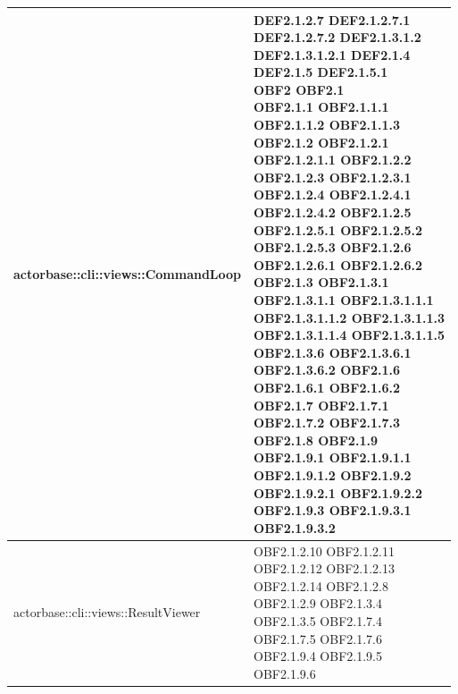 \documentclass{scalatekids-article}
\begin{document}
\begin{longtable}[H]{|p{12cm}|p{5.5cm}|}
\hline
actorbase::cli::views::CommandLoop & \multiLineCell[t]{DEF2.1.2.7 DEF2.1.2.7.1\\DEF2.1.2.7.2 DEF2.1.3.1.2\\DEF2.1.3.1.2.1 DEF2.1.4\\DEF2.1.5 DEF2.1.5.1\\OBF2 OBF2.1\\OBF2.1.1 OBF2.1.1.1\\OBF2.1.1.2 OBF2.1.1.3\\OBF2.1.2 OBF2.1.2.1\\OBF2.1.2.1.1 OBF2.1.2.2\\OBF2.1.2.3 OBF2.1.2.3.1\\OBF2.1.2.4 OBF2.1.2.4.1\\OBF2.1.2.4.2 OBF2.1.2.5\\OBF2.1.2.5.1 OBF2.1.2.5.2\\OBF2.1.2.5.3 OBF2.1.2.6\\OBF2.1.2.6.1 OBF2.1.2.6.2\\OBF2.1.3 OBF2.1.3.1\\OBF2.1.3.1.1 OBF2.1.3.1.1.1\\OBF2.1.3.1.1.2 OBF2.1.3.1.1.3\\OBF2.1.3.1.1.4 OBF2.1.3.1.1.5\\OBF2.1.3.6 OBF2.1.3.6.1\\OBF2.1.3.6.2 OBF2.1.6\\OBF2.1.6.1 OBF2.1.6.2\\OBF2.1.7 OBF2.1.7.1\\OBF2.1.7.2 OBF2.1.7.3\\OBF2.1.8 OBF2.1.9\\OBF2.1.9.1 OBF2.1.9.1.1\\OBF2.1.9.1.2 OBF2.1.9.2\\OBF2.1.9.2.1 OBF2.1.9.2.2\\OBF2.1.9.3 OBF2.1.9.3.1\\OBF2.1.9.3.2}\\
\hline
actorbase::cli::views::ResultViewer & \multiLineCell[t]{OBF2.1.2.10 OBF2.1.2.11\\OBF2.1.2.12 OBF2.1.2.13\\OBF2.1.2.14 OBF2.1.2.8\\OBF2.1.2.9 OBF2.1.3.4\\OBF2.1.3.5 OBF2.1.7.4\\OBF2.1.7.5 OBF2.1.7.6\\OBF2.1.9.4 OBF2.1.9.5\\OBF2.1.9.6}\\
\hline

\end{longtable}
\end{document}
